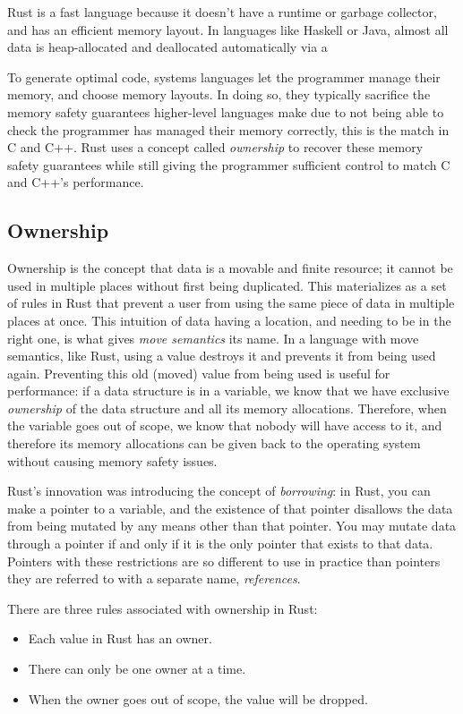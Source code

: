 \documentclass[12pt,twoside]{report}
\begin{document}
Rust is a fast language because it doesn't have a runtime or garbage collector, and has an efficient memory layout. In languages like Haskell or Java, almost all data is heap-allocated and deallocated automatically via a 

To generate optimal code, systems languages let the programmer manage their memory, and choose memory layouts. In doing so, they typically sacrifice the memory safety guarantees higher-level languages make due to not being able to check the programmer has managed their memory correctly, this is the match in C and C++. Rust uses a concept called \textit{ownership} to recover these memory safety guarantees while still giving the programmer sufficient control to match C and C++'s performance.

\subsection{Ownership}
Ownership is the concept that data is a movable and finite resource; it cannot be used in multiple places without first being duplicated. This materializes as a set of rules in Rust that prevent a user from using the same piece of data in multiple places at once. This intuition of data having a location, and needing to be in the right one, is what gives \textit{move semantics} its name. In a language with move semantics, like Rust, using a value destroys it and prevents it from being used again. Preventing this old (moved) value from being used is useful for performance: if a data structure is in a variable, we know that we have exclusive \textit{ownership} of the data structure and all its memory allocations. Therefore, when the variable goes out of scope, we know that nobody will have access to it, and therefore its memory allocations can be given back to the operating system without causing memory safety issues.

Rust's innovation was introducing the concept of \textit{borrowing}: in Rust, you can make a pointer to a variable, and the existence of that pointer disallows the data from being mutated by any means other than that pointer. You may mutate data through a pointer if and only if it is the only pointer that exists to that data. Pointers with these restrictions are so different to use in practice than pointers they are referred to with a separate name, \textit{references}.

There are three rules associated with ownership in Rust:
\begin{itemize}
  \item Each value in Rust has an owner.
  \item There can only be one owner at a time.
  \item When the owner goes out of scope, the value will be dropped.
\end{itemize}
\end{document}
